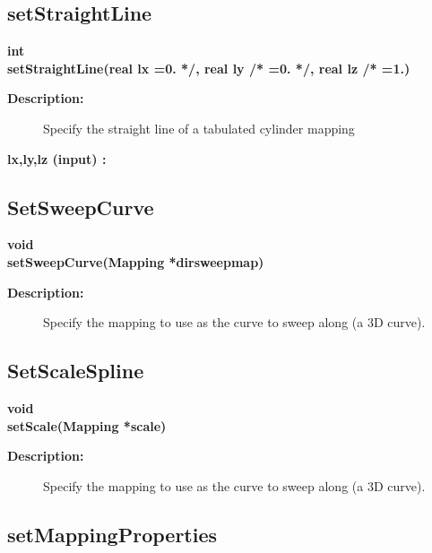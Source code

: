 \subsection{setStraightLine}
 
\begin{flushleft} \textbf{%
int  \\ 
\settowidth{\SweepMappingIncludeArgIndent}{setStraightLine(}%
setStraightLine(real lx  =0. */, real ly /* =0. */, real lz /* =1.)
}\end{flushleft}
\begin{description}
\item[{\bf Description:}]  Specify the straight line of a tabulated cylinder mapping
\item[{\bf lx,ly,lz (input) :}]  
\end{description}
\subsection{SetSweepCurve}
 
\begin{flushleft} \textbf{%
void  \\ 
\settowidth{\SweepMappingIncludeArgIndent}{setSweepCurve(}%
setSweepCurve(Mapping *dirsweepmap)
}\end{flushleft}
\begin{description}
\item[{\bf Description:}]  Specify the mapping to use as the curve to
               sweep along (a  3D curve).
\end{description}
\subsection{SetScaleSpline}
 
\begin{flushleft} \textbf{%
void  \\ 
\settowidth{\SweepMappingIncludeArgIndent}{setScale(}%
setScale(Mapping *scale)
}\end{flushleft}
\begin{description}
\item[{\bf Description:}]  Specify the mapping to use as the curve to
               sweep along (a  3D curve).
\end{description}
\subsection{setMappingProperties}
 
